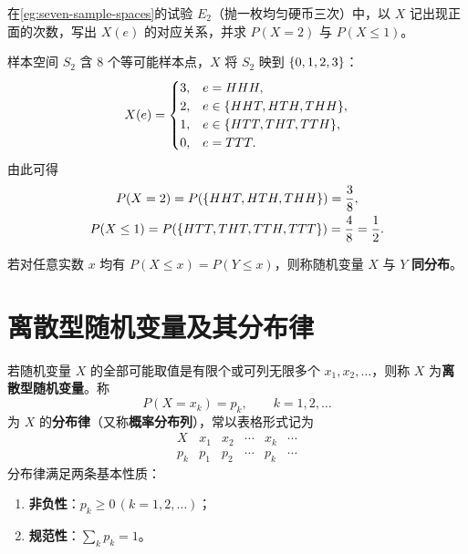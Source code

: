 \begin{example}[title={从样本点映射到随机变量}]
\label{eg:rv-coin-sum}
在\cref{eg:seven-sample-spaces}的试验 $E_2$（抛一枚均匀硬币三次）中，以 $X$ 记出现正面的次数，写出 $X(e)$ 的对应关系，并求 $P(X=2)$ 与 $P(X\le 1)$。
\begin{solution}
样本空间 $S_2$ 含 $8$ 个等可能样本点，$X$ 将 $S_2$ 映到 $\{0,1,2,3\}$：
\[
  X(e)=
  \begin{cases}
    3,& e=HHH,\\
    2,& e\in\{HHT,HTH,THH\},\\
    1,& e\in\{HTT,THT,TTH\},\\
    0,& e=TTT.
  \end{cases}
\]
由此可得
\[
  \begin{gathered}
    P(X=2)=P(\{HHT,HTH,THH\})=\frac{3}{8},\\
    P(X\le 1)=P(\{HTT,THT,TTH,TTT\})=\frac{4}{8}=\frac{1}{2}.
  \end{gathered}
\]
\end{solution}
\end{example}

\begin{definition}[同分布]
\label{def:identically-distributed}
若对任意实数 $x$ 均有 $P(X\le x)=P(Y\le x)$，则称随机变量 $X$ 与 $Y$ \textbf{同分布}。
\end{definition}

\section{离散型随机变量及其分布律}
\label{sec:discrete-law}

\begin{definition}[离散型随机变量与分布律]
\label{def:discrete-rv}
若随机变量 $X$ 的全部可能取值是有限个或可列无限多个 $x_1,x_2,\ldots$，则称 $X$ 为\textbf{离散型随机变量}。称
\begin{equation}
  P(X=x_k)=p_k,\qquad k=1,2,\ldots
  \label{eq:pmf-def}
\end{equation}
为 $X$ 的\textbf{分布律}（又称\textbf{概率分布列}），常以表格形式记为
\[
\begin{array}{c|ccccc}
  X & x_1 & x_2 & \cdots & x_k & \cdots \\ \hline
  p_k & p_1 & p_2 & \cdots & p_k & \cdots
\end{array}
\]
分布律满足两条基本性质：
\begin{enumerate}
  \item \textbf{非负性}：$p_k\ge 0\,(k=1,2,\ldots)$；
  \item \textbf{规范性}：$\sum_{k}p_k=1$。
\end{enumerate}
\end{definition}

